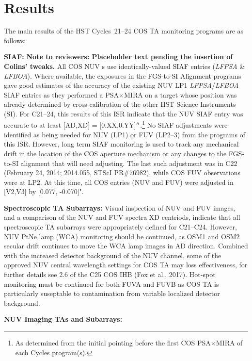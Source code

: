 \section{Results}\label{sec:results}
The main results of the HST Cycles~21--24 COS TA monitoring programs are as follows:
\begin{description}
\item{\bf SIAF:}{
	{\bf Note to reviewers: Placeholder text pending the insertion of Colins' tweaks.}
	All COS NUV s use identically-valued SIAF entries ({\it LFPSA} \& {\it LFBOA}).
	Where available, the exposures in the FGS-to-SI Alignment programs gave good estimates of the accuracy of the existing NUV LP1 {\it LFPSA}/{\it LFBOA} SIAF entries
	as they performed a PSA$\times$MIRA  on a target whose position was already determined by cross-calibration of the other HST Science Instruments (SI).
	For C21--24, this results of this ISR indicate that the NUV SIAF entry was accurate to at least [AD,XD] = [0.XX,0.YY]$\hbox{$^{\prime\prime}$}$.\footnote{As determined from the initial pointing before the first COS PSA$\times$MIRA  of each Cycles program(s).}
	No SIAF adjustments were identified as being needed for NUV (LP1) or FUV (LP2--3) from the programs of this ISR.
	However, long term SIAF monitoring is used to track any mechanical drift in the location of the COS aperture mechanism or any changes to the FGS-to-SI alignment that will need adjusting.
	The last such adjustment was in C22 (February 24, 2014; 2014.055, STScI PR\#76982), while COS FUV observations were at LP2. At this time, all COS entries (NUV and FUV) were adjusted in [V2,V3] by [0.077, -0.070]".
}
\item{\bf Spectroscopic TA Subarrays:} Visual inspection of NUV and FUV images, and a comparison of the NUV and FUV spectra XD centriods, indicate that all spectroscopic TA subarrays were appropriately defined for C21--C24.
However, NUV PtNe lamp (WCA) monitoring should be continued, as OSM1 and OSM2 secular drift continues to move the WCA lamp images in AD direction. Combined with the increased
detector background of the NUV channel, some of the approved NUV central wavelength settings for COS TA
may loss effectiveness, for further details see 2.6 of the C25 COS IHB (Fox et al., 2017).
Hot-spot monitoring must be continued for both FUVA and FUVB as COS TA is particularly
suseptable to contamination from variable localized detector background.
\item{\bf NUV Imaging TAs and Subarrays:}

\end{description}

